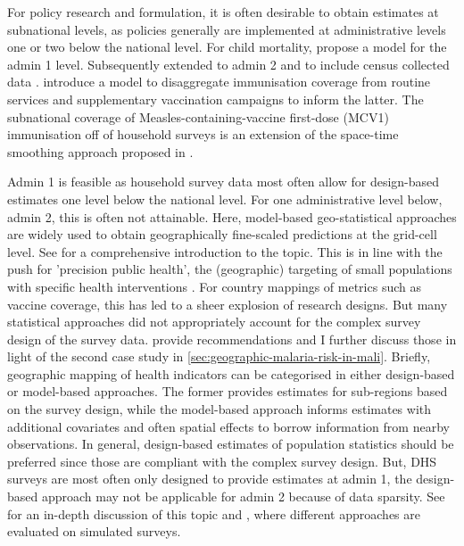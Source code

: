 For policy research and formulation, it is often desirable to obtain estimates at subnational levels, as policies generally are implemented at administrative levels one or two below the national level. For child mortality, \textcite{mercerSpaceTimeSmoothing2015} propose a model for the admin 1 level. Subsequently extended to admin 2 \autocite{wakefieldEstimatingUnderfiveMortality2019} and to include census collected data \autocite{godwinSpaceTimeModeling2021}. \textcite{dongSpacetimeSmoothingModels2021} introduce a model to disaggregate immunisation coverage from routine services and supplementary vaccination campaigns to inform the latter. The subnational coverage of Measles-containing-vaccine first-dose (MCV1) immunisation off of household surveys is an extension of the space-time smoothing approach proposed in \textcite{mercerSpaceTimeSmoothing2015}.

Admin 1 is feasible as household survey data most often allow for design-based estimates one level below the national level. For one administrative level below, admin 2, this is often not attainable. Here, model-based geo-statistical approaches are widely used to obtain geographically fine-scaled predictions at the grid-cell level. See \textcite{giorgiModelbasedGeostatisticsGlobal2021, diggleModelBasedGeostatisticsPrevalence2016} for a comprehensive introduction to the topic. This is in line with the push for 'precision public health', the (geographic) targeting of small populations with specific health interventions \autocite{dowellFourStepsPrecision2016, desmond-hellmannProgressLiesPrecision2016}. For country mappings of metrics such as vaccine coverage, this has led to a sheer explosion of research designs. But many statistical approaches did not appropriately account for the complex survey design of the survey data. \textcite{dongModelingPresentationVaccination2021} provide recommendations and I further discuss those in light of the second case study in \autoref{sec:geographic-malaria-risk-in-mali}. Briefly, geographic mapping of health indicators can be categorised in either design-based or model-based approaches. The former provides estimates for sub-regions based on the survey design, while the model-based approach informs estimates with additional covariates and often spatial effects to borrow information from nearby observations. In general, design-based estimates of population statistics should be preferred since those are compliant with the complex survey design. But, DHS surveys are most often only designed to provide estimates at admin 1, the design-based approach may not be applicable for admin 2 because of data sparsity. See \textcite{fuglstadTwoCulturesPrevalence2022} for an in-depth discussion of this topic and \textcite{paigeDesignModelBasedApproaches2022}, where different approaches are evaluated on simulated surveys.

